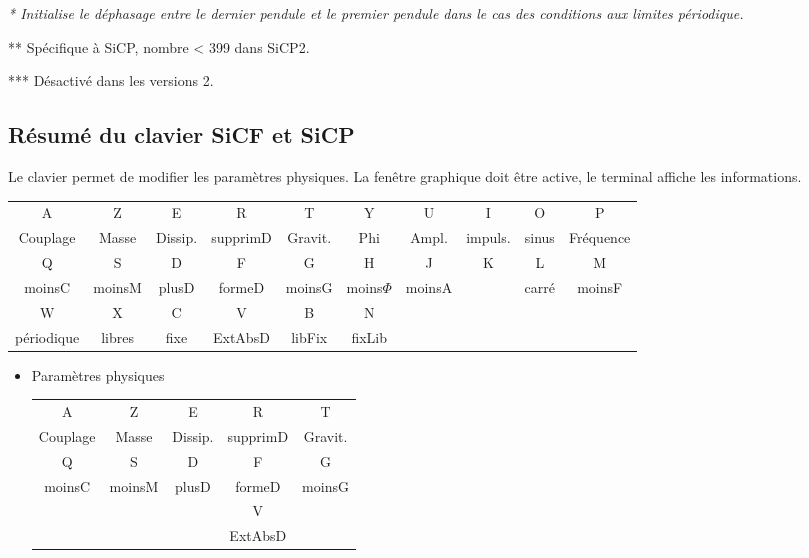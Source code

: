 {\it
* Initialise le déphasage entre le dernier pendule et le premier pendule dans le cas des conditions aux limites périodique.

** Spécifique à SiCP, nombre < 399 dans SiCP2.

*** Désactivé dans les versions 2.
}
%
%
\subsection{Résumé du clavier SiCF et SiCP}
%
Le clavier permet de modifier les paramètres physiques. La fenêtre graphique doit être active, le terminal affiche les informations.
%
%
\footnotesize
\begin{center}
\begin{tabular}{cccccccccc}
\sf A &\sf Z &\sf E &\sf R &\sf T &\sf Y &\sf U &\sf I &\sf O &\sf P \\
Couplage & Masse & Dissip. & supprimD & Gravit. & Phi & Ampl. & impuls. & sinus & Fréquence \\
\sf Q &\sf S &\sf D &\sf F &\sf G &\sf H &\sf J &\sf K &\sf L &\sf M \\
moinsC & moinsM & plusD & formeD & moinsG & moins$\Phi$ & moinsA &  & carré & moinsF \\
\sf W &\sf X &\sf C &\sf V &\sf B &\sf N &  &  &  & \\
périodique & libres & fixe & ExtAbsD & libFix & fixLib &  &  &  & \\
\end{tabular}
\end{center}
\vspace{.3cm}
%
\normalsize
\begin{itemize}[leftmargin=2cm, label=, itemsep=0pt]%
\item Paramètres physiques

\begin{tabular}{ccccc}
\sf A &\sf Z &\sf E &\sf R &\sf T  \\
Couplage & Masse & Dissip. & supprimD & Gravit.  \\
\sf Q &\sf S &\sf D &\sf F &\sf G  \\
moinsC & moinsM & plusD & formeD & moinsG  \\
 & & & \sf V   & \\
 & & & ExtAbsD &  \\
\end{tabular}
%
\end{itemize}
